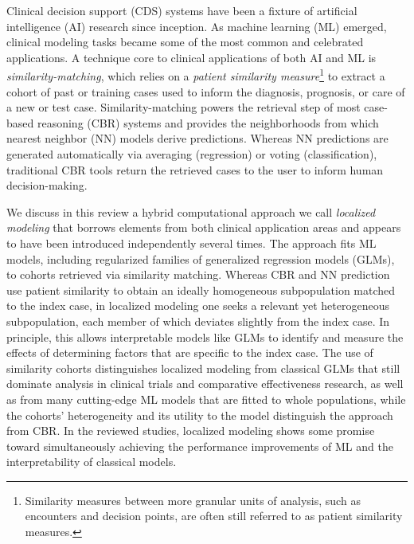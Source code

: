 \documentclass[preprint, 3p,
authoryear]{elsarticle} %
\begin{document}
Clinical decision support (CDS) systems have been a fixture of
artificial intelligence (AI) research since inception. As machine
learning (ML) emerged, clinical modeling tasks became some of the most
common and celebrated applications. A technique core to clinical
applications of both AI and ML is \emph{similarity-matching}, which
relies on a \emph{patient similarity measure}\footnote{Similarity
  measures between more granular units of analysis, such as encounters
  and decision points, are often still referred to as patient similarity
  measures.} to extract a cohort of past or training cases used to
inform the diagnosis, prognosis, or care of a new or test case.
Similarity-matching powers the retrieval step of most case-based
reasoning (CBR) systems and provides the neighborhoods from which
nearest neighbor (NN) models derive predictions. Whereas NN predictions
are generated automatically via averaging (regression) or voting
(classification), traditional CBR tools return the retrieved cases to
the user to inform human decision-making.

We discuss in this review a hybrid computational approach we call
\emph{localized modeling} that borrows elements from both clinical
application areas and appears to have been introduced independently
several times. The approach fits ML models, including regularized
families of generalized regression models (GLMs), to cohorts retrieved
via similarity matching. Whereas CBR and NN prediction use patient
similarity to obtain an ideally homogeneous subpopulation matched to the
index case, in localized modeling one seeks a relevant yet heterogeneous
subpopulation, each member of which deviates slightly from the index
case. In principle, this allows interpretable models like GLMs to
identify and measure the effects of determining factors that are
specific to the index case. The use of similarity cohorts distinguishes
localized modeling from classical GLMs that still dominate analysis in
clinical trials and comparative effectiveness research, as well as from
many cutting-edge ML models that are fitted to whole populations, while
the cohorts' heterogeneity and its utility to the model distinguish the
approach from CBR. In the reviewed studies, localized modeling shows
some promise toward simultaneously achieving the performance
improvements of ML and the interpretability of classical models.
\end{document}
